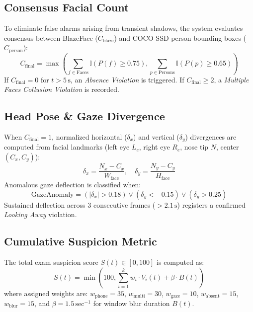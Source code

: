 \documentclass[conference]{IEEEtran}
\begin{document}
\subsection{Consensus Facial Count}
To eliminate false alarms arising from transient shadows, the system evaluates consensus between BlazeFace ($C_{\text{blaze}}$) and COCO-SSD person bounding boxes ($C_{\text{person}}$):
\begin{equation}
C_{\text{final}} = \max\left( \sum_{f \in \text{Faces}} \mathbb{I}(P(f) \ge 0.75), \sum_{p \in \text{Persons}} \mathbb{I}(P(p) \ge 0.65) \right)
\end{equation}
If $C_{\text{final}} = 0$ for $t > 5\,\text{s}$, an \textit{Absence Violation} is triggered. If $C_{\text{final}} \ge 2$, a \textit{Multiple Faces Collusion Violation} is recorded.

\subsection{Head Pose \& Gaze Divergence}
When $C_{\text{final}} = 1$, normalized horizontal ($\delta_x$) and vertical ($\delta_y$) divergences are computed from facial landmarks (left eye $L_e$, right eye $R_e$, nose tip $N$, center $(C_x, C_y)$):
\begin{equation}
\delta_x = \frac{N_x - C_x}{W_{\text{face}}}, \quad \delta_y = \frac{N_y - C_y}{H_{\text{face}}}
\end{equation}
Anomalous gaze deflection is classified when:
\begin{equation}
\text{GazeAnomaly} = (|\delta_x| > 0.18) \lor (\delta_y < -0.15) \lor (\delta_y > 0.25)
\end{equation}
Sustained deflection across 3 consecutive frames ($> 2.1\,\text{s}$) registers a confirmed \textit{Looking Away} violation.

\subsection{Cumulative Suspicion Metric}
The total exam suspicion score $S(t) \in [0, 100]$ is computed as:
\begin{equation}
S(t) = \min\left(100, \sum_{i=1}^{k} w_i \cdot V_i(t) + \beta \cdot B(t)\right)
\end{equation}
where assigned weights are:
$w_{\text{phone}} = 35$, $w_{\text{multi}} = 30$, $w_{\text{gaze}} = 10$, $w_{\text{absent}} = 15$, $w_{\text{blur}} = 15$, and $\beta = 1.5\,\text{sec}^{-1}$ for window blur duration $B(t)$.
\end{document}
